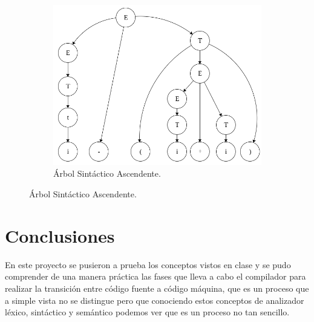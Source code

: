 \documentclass[letterpaper]{article}
\begin{document}
\begin{figure}[H]
    \centering
    \begin{subfigure}{0.45\textwidth}
        \includegraphics[width=\textwidth]{img/arbol_sint}
        \caption*{Árbol Sintáctico Ascendente.}
    \end{subfigure}
\end{figure}

\section{Conclusiones}
En este proyecto se pusieron a prueba los conceptos vistos en clase y se pudo
comprender de una manera práctica las fases que lleva a cabo el compilador para 
realizar la transición entre código fuente a código máquina, que es un proceso
que a simple vista no se distingue pero que conociendo estos conceptos de analizador
léxico, sintáctico y semántico podemos ver que es un proceso no tan sencillo.
\end{document}
